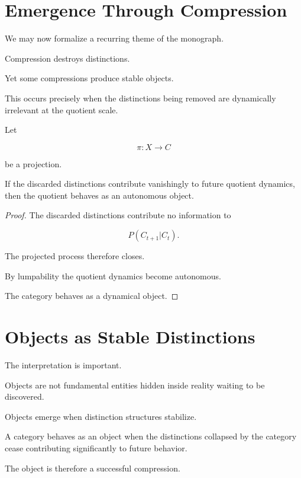 \documentclass[11pt,oneside,openany]{book}
\begin{document}
\section{Emergence Through Compression}

We may now formalize a recurring theme of the monograph.

Compression destroys distinctions.

Yet some compressions produce stable objects.

This occurs precisely when the distinctions being removed are dynamically irrelevant at the quotient scale.

\begin{theorem}

Let

\[
\pi:X\rightarrow C
\]

be a projection.

If the discarded distinctions contribute vanishingly to future quotient dynamics, then the quotient behaves as an autonomous object.

\end{theorem}

\begin{proof}

The discarded distinctions contribute no information to

\[
P(C_{t+1}|C_t).
\]

The projected process therefore closes.

By lumpability the quotient dynamics become autonomous.

The category behaves as a dynamical object.

\end{proof}

\section{Objects as Stable Distinctions}

The interpretation is important.

Objects are not fundamental entities hidden inside reality waiting to be discovered.

Objects emerge when distinction structures stabilize.

A category behaves as an object when the distinctions collapsed by the category cease contributing significantly to future behavior.

The object is therefore a successful compression.
\end{document}
